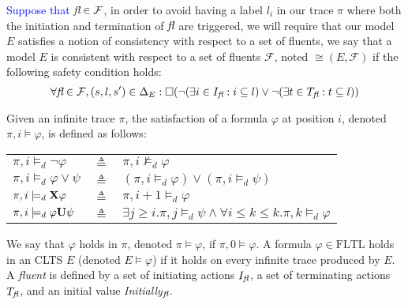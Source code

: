 \textcolor{blue}{Suppose that} $\emph{fl} \in \mathcal{F}$, in order to avoid having a label $l_i$ in our trace $\pi$ where both the initiation and termination of $\emph{fl}$ are triggered, we will require that our model $E$ satisfies a notion of consistency with respect to a set of fluents, we say that a model $E$ is consistent with respect to a set of fluents $\mathcal{F}$, noted $\cong(E,\mathcal{F})$ if the following safety condition holds: 
\[\forall \emph{fl} \in \mathcal{F}, (s,l,s') \in \Delta_E: \square(\neg(\exists i \in I_{\emph{fl}}: i \subseteq l) \vee \neg(\exists t \in T_{\emph{fl}}: t \subseteq l))\]



Given an infinite trace $\pi$, the satisfaction of a formula $\varphi$ at position $i$, denoted $\pi,i\models\varphi$, is defined as follows:

\begin{tabular}{ l c l }
$\pi, i \models_d \neg \varphi$ & $\triangleq$ & $\pi, i \not\models_d \varphi$\\
$\pi, i \models_d \varphi \vee \psi$ & $\triangleq$ & $(\pi, i \models_d \varphi) \vee (\pi, i \models_d \psi)$\\
$\pi, i \models_d {\bf X} \varphi$ & $\triangleq$ & $\pi, i +1 \models_d \varphi$\\
$\pi, i \models_d \varphi {\bf U} \psi$ & $\triangleq$ & $\exists j \geq i . \pi,j \models_d \psi \wedge \forall i \leq k \le k. \pi, k \models_d \varphi$\\
\end{tabular}
  
We say that $\varphi$ holds in $\pi$, denoted $\pi\models\varphi$, if $\pi,0\models\varphi$. 
A formula $\varphi \in \mbox{FLTL}$ holds in an CLTS $E$ (denoted $E \models \varphi$) if it holds on every infinite trace produced by $E$.
A \emph{fluent} \fluent \space is defined by a set of initiating actions $I_{\emph{fl}}$, a set of terminating actions $T_{\emph{fl}}$, and an initial value \emph{Initially}$_{\emph{fl}}$.

